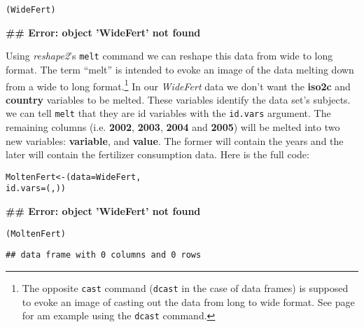 \begin{knitrout}
\color{fgcolor}\begin{kframe}
\begin{alltt}
(WideFert)
\end{alltt}


{\ttfamily\noindent\bfseries\textcolor{errorcolor}{\#\# Error: object 'WideFert' not found}}\end{kframe}
\end{knitrout}


Using \emph{reshape2}'s \texttt{melt}\label{MeltReshape} command we can reshape this data from wide to long format. The term ``melt'' is intended to evoke an image of the data melting down from a wide to long format.\footnote{The opposite \texttt{cast} command (\texttt{dcast} in the case of data frames) is supposed to evoke an image of casting out the data from long to wide format. See page \pageref{WideAppendix} for am example using the \texttt{dcast} command.} In our \emph{WideFert} data we don't want the \textbf{iso2c} and \textbf{country} variables to be melted. These variables identify the data set's subjects. we can tell \texttt{melt} that they are id variables with the \texttt{id.vars} argument. The remaining columns (i.e. \textbf{2002}, \textbf{2003}, \textbf{2004} and \textbf{2005}) will be melted into two new variables: \textbf{variable}, and \textbf{value}. The former will contain the years and the later will contain the fertilizer consumption data. Here is the full code:

\begin{knitrout}
\color{fgcolor}\begin{kframe}
\begin{alltt}
MoltenFert <- (data = WideFert, 
                    id.vars = (, ))
\end{alltt}


{\ttfamily\noindent\bfseries\textcolor{errorcolor}{\#\# Error: object 'WideFert' not found}}\begin{alltt}

(MoltenFert)
\end{alltt}
\begin{verbatim}
## data frame with 0 columns and 0 rows
\end{verbatim}
\end{kframe}
\end{knitrout}


